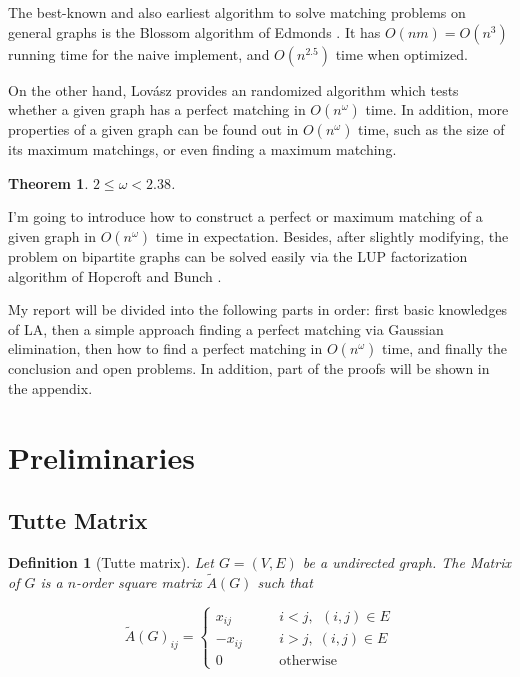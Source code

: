 \documentclass[a4paper]{article}
\newtheorem*{definition}{\hspace{2em}Definition}
\newtheorem{theorem}{\hspace{2em}Theorem}
\begin{document}
		The best-known and also earliest algorithm to solve matching problems on general graphs is the Blossom algorithm of Edmonds \cite{blossom} . It has $O(nm) = O(n^3)$ running time for the naive implement, and $O(n^{2.5})$ \cite{optimized} time when optimized.

		On the other hand, Lov\'asz \cite{lovasz} provides an randomized algorithm which tests whether a given graph has a perfect matching in $O(n^\omega)$ time. In addition, more properties of a given graph can be found out in $O(n^\omega)$ time, such as the size of its maximum matchings, or even finding a maximum matching.

		\begin{theorem}
			$2 \le \omega < 2.38$.
		\end{theorem}

		I'm going to introduce how to construct a perfect or maximum matching of a given graph in $O(n^\omega)$ time in expectation. Besides, after slightly modifying, the problem on bipartite graphs can be solved easily via the LUP factorization algorithm of Hopcroft and Bunch \cite{lu} .

		My report will be divided into the following parts in order: first basic knowledges of LA, then a simple approach finding a perfect matching via Gaussian elimination, then how to find a perfect matching in $O(n^\omega)$ time, and finally the conclusion and open problems. In addition, part of the proofs will be shown in the appendix.
	
	\section{Preliminaries}

		\subsection{Tutte Matrix}

			\begin{definition}[Tutte matrix]
				Let $G=(V,E)$ be a undirected graph. The  Matrix of $G$ is a $n$-order square matrix $\tilde A(G)$ such that

				$$ \tilde A(G)_{ij} = \left\{ \begin{aligned} x_{ij} & \quad & i<j,\,\; (i,j)\in E \\ -x_{ij} & \quad & i > j,\; (i,j) \in E \\ 0 & \quad & \text{otherwise}\end{aligned} \right. $$
			\end{definition}
\end{document}
